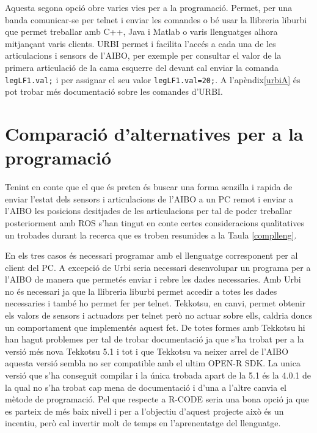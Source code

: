 \documentclass[12pt,a4paper,final,twoside]{article}
\begin{document}
Aquesta segona opció obre varies vies per a la programació. Permet, per una banda comunicar-se per telnet i enviar les comandes o bé usar la llibreria liburbi que permet treballar amb C++, Java i Matlab o varis llenguatges alhora mitjançant varis clients.
URBI permet i facilita l'accés a cada una de les articulacions i sensors de l'AIBO, per exemple per consultar el valor de la primera articulació de la cama esquerre del devant cal enviar la comanda \texttt{legLF1.val;} i per assignar el seu valor \texttt{legLF1.val=20;}\cite{urbicmd}. A l'apèndix\ref{urbiA} és pot trobar més documentació sobre les comandes d'URBI.

\clearpage



\section{Comparació d'alternatives per a la programació}\label{seccomp}


Tenint en conte que el que és preten és buscar una forma senzilla i rapida de enviar l'estat dels sensors i articulacions de l'AIBO a un PC remot i enviar a l'AIBO les posicions desitjades de les articulacions per tal de poder treballar posteriorment amb ROS s'han tingut en conte certes consideracions qualitatives un trobades durant la recerca que es troben resumides a la Taula \ref{complleng}.

En els tres casos és necessari programar amb el llenguatge corresponent per al client del PC. A excepció de Urbi seria necessari desenvolupar un programa per a l'AIBO de manera que permetés enviar i rebre les dades necessaries. Amb Urbi no és necessari ja que la llibreria liburbi permet accedir a totes les dades necessaries i també ho permet fer per telnet. Tekkotsu, en canvi, permet obtenir els valors de sensors i actuadors per telnet però no actuar sobre ells, caldria doncs un comportament que implementés aquest fet. De totes formes amb Tekkotsu hi han hagut problemes per tal de trobar documentació ja que s'ha trobat per a la versió més nova Tekkotsu 5.1 i tot i que Tekkotsu va neixer arrel de l'AIBO aquesta versió sembla no ser compatible amb el ultim OPEN-R SDK. La unica versió que s'ha conseguit compilar i la única trobada apart de la 5.1 és la 4.0.1 de la qual no s'ha trobat cap mena de documentació i d'una a l'altre canvia el mètode de programació.
Pel que respecte a R-CODE seria una bona opció ja que es parteix de més baix nivell i per a l'objectiu d'aquest projecte això és un incentiu, però cal invertir molt de temps en l'aprenentatge del llenguatge. 
\end{document}
